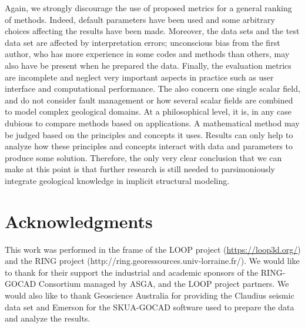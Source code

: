 \documentclass[preprint]{ring20}
\begin{document}
Again, we strongly discourage the use of proposed metrics for a general ranking of methods. Indeed, default parameters have been used and some arbitrary choices affecting the results have been made. Moreover, the data sets and the test data set are affected by interpretation errors; unconscious bias from the first author, who has more experience in some codes and methods than others, may also have be present when he prepared the data. Finally, the evaluation metrics are incomplete and neglect very important aspects in practice such as user interface and computational performance. The also concern one single scalar field, and do not consider fault management or how several scalar fields are combined to model complex geological domains. At a philosophical level, it is, in any case dubious to compare methods based on applications. A mathematical method may be judged based on the principles and concepts it uses. Results can only help to analyze how these principles and concepts interact with data and parameters to produce some solution. Therefore, the only very clear conclusion that we can make at this point is that further research is still needed to parsimoniously integrate geological knowledge in implicit structural modeling. 

\section*{Acknowledgments}

This work was performed in the frame of the LOOP project (\url{https://loop3d.org/}) and the RING project (http://ring.georessources.univ-lorraine.fr/). We would like to thank for their support the industrial and academic sponsors of the RING-GOCAD Consortium managed by ASGA, and the LOOP project partners. We would also like to thank Geoscience Australia for providing the Claudius seismic data set and Emerson for the SKUA-GOCAD software used to prepare the data and analyze the results. 


\end{document}
